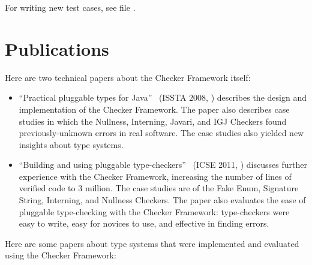 For writing new test cases, see file
.


\section{Publications\label{publications}\label{learning-more}}

Here are two technical papers about the Checker Framework itself:

\begin{itemize}
\item
``Practical pluggable types for Java''~\cite{PapiACPE2008}
(ISSTA 2008, )
describes the design and implementation of the Checker Framework.
The paper also describes case
studies in which the Nullness, Interning, Javari, and IGJ Checkers found
previously-unknown errors in real software.
The case studies also yielded new insights about type systems.

\item
``Building and using pluggable
type-checkers''~\cite{DietlDEMS2011}
(ICSE 2011, )
discusses further experience with the Checker Framework, increasing the
number of lines of verified code to 3 million.  The case studies are of the
Fake Enum, Signature String, Interning, and Nullness Checkers.
The paper also evaluates the ease
of pluggable type-checking with the Checker Framework:  type-checkers
were easy to write, easy for novices to use, and effective in finding
errors.
\end{itemize}

Here are some papers about type systems that were implemented and evaluated
using the Checker Framework:

